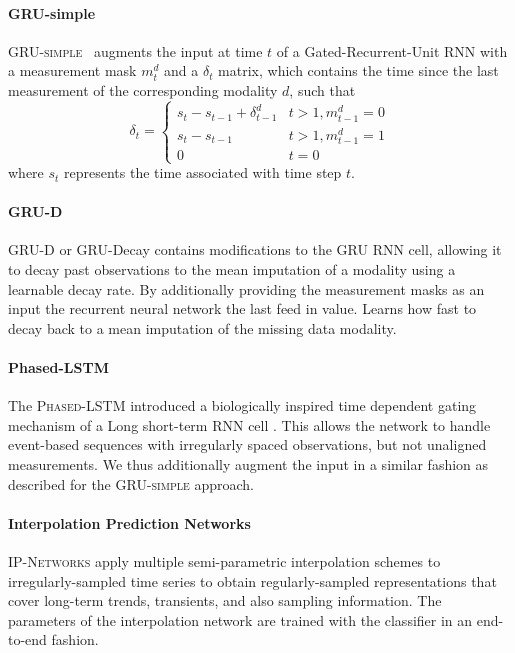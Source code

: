 \documentclass{article}
\newcommand{\method}[1]{\textsc{#1}}
\begin{document}
\paragraph{GRU-simple}
\method{GRU-simple}~\citep{che2018recurrent} augments the input at time
$t$ of a Gated-Recurrent-Unit RNN with a measurement mask $m_t^d$ and a $\delta_t$
matrix, which contains the time since the last measurement of the corresponding
modality $d$, such that
\begin{equation*}
    \delta_t = \begin{cases}
        s_t - s_{t-1} + \delta_{t-1}^d & t > 1, m^d_{t-1} = 0 \\
        s_t - s_{t-1} & t > 1, m^d_{t-1} = 1 \\
        0             & t = 0
    \end{cases}
\end{equation*}
where $s_t$ represents the time associated with time step $t$.

\paragraph{GRU-D}
\method{GRU-D} or GRU-Decay \citep{che2018recurrent} contains modifications to the
GRU RNN cell, allowing it to decay past observations to the mean imputation of
a modality using a learnable decay rate. By additionally providing the
measurement masks as an input the recurrent neural network
the last feed in value. Learns how fast to decay back to a mean imputation of
the missing data modality.

\paragraph{Phased-LSTM}
The \method{Phased-LSTM} \citep{neil2016phased} introduced
a biologically inspired time dependent gating mechanism of a Long
short-term RNN cell \citep{hochreiter1997long}. This allows the network
to handle event-based sequences with irregularly spaced observations,
but not unaligned measurements. We thus additionally augment the input
in a similar fashion as described for the \method{GRU-simple} approach.

\paragraph{Interpolation Prediction Networks}
\method{IP-Networks} \citep{shukla2018interpolationprediction} apply
multiple semi-parametric interpolation schemes to irregularly-sampled
time series to obtain regularly-sampled representations that cover
long-term trends, transients, and also sampling information. The
parameters of the interpolation network are trained with the classifier
in an end-to-end fashion.
\end{document}
